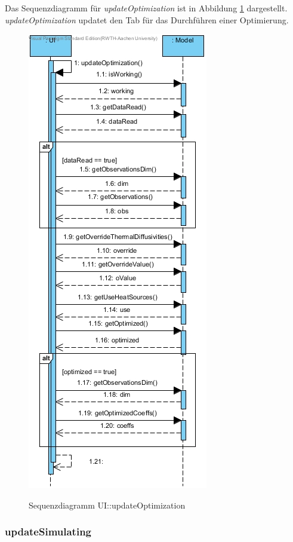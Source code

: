 Das Sequenzdiagramm für \emph{updateOptimization} ist in Abbildung \ref{Sequenzdiagramm UI::updateOptimization} dargestellt. \emph{updateOptimization} updatet den Tab für das Durchführen einer Optimierung.

\begin{figure}[H]
	\centering
	\includegraphics[scale=.75]{Bilder/UI__updateOptimization().jpg}\\
	\caption{Sequenzdiagramm UI::updateOptimization}
	\label{Sequenzdiagramm UI::updateOptimization}
\end{figure}

\subsubsection*{updateSimulating}

